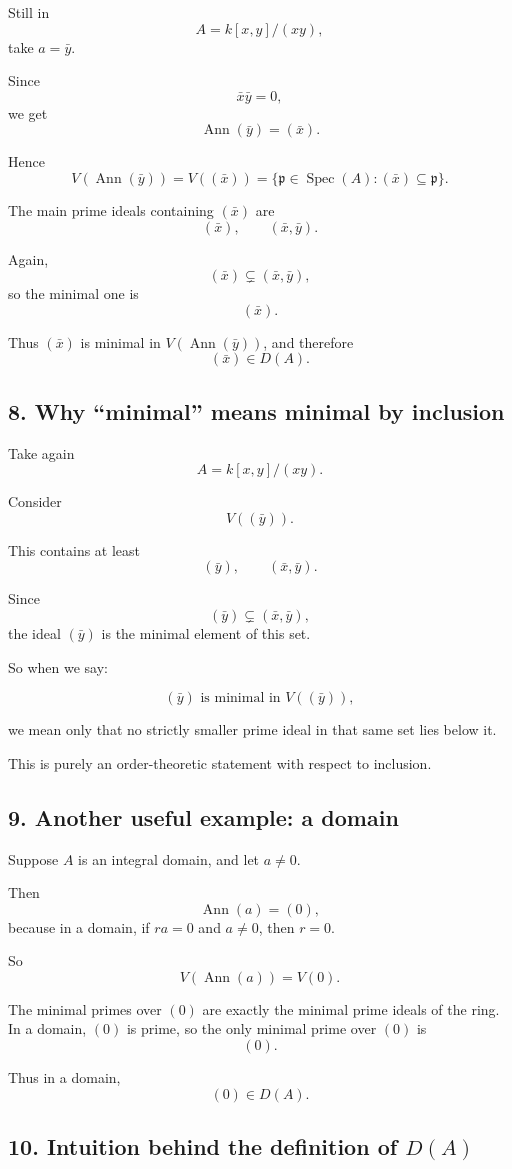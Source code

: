 \documentclass[12pt,a4paper]{article}
\theoremstyle{notespace}
\DeclareMathOperator{\Spec}{Spec}
\DeclareMathOperator{\Ann}{Ann}
\begin{document}
Still in
\[
A=k[x,y]/(xy),
\]
take \(a=\bar y\).

Since
\[
\bar x\bar y=0,
\]
we get
\[
\Ann(\bar y)=(\bar x).
\]

Hence
\[
V(\Ann(\bar y))=V((\bar x))
=\{\mathfrak p\in \Spec(A): (\bar x)\subseteq \mathfrak p\}.
\]

The main prime ideals containing \((\bar x)\) are
\[
(\bar x), \qquad (\bar x,\bar y).
\]

Again,
\[
(\bar x)\subsetneq (\bar x,\bar y),
\]
so the minimal one is
\[
(\bar x).
\]

Thus \((\bar x)\) is minimal in \(V(\Ann(\bar y))\), and therefore
\[
(\bar x)\in D(A).
\]

\subsection*{8. Why ``minimal'' means minimal by inclusion}

Take again
\[
A=k[x,y]/(xy).
\]

Consider
\[
V((\bar y)).
\]

This contains at least
\[
(\bar y), \qquad (\bar x,\bar y).
\]

Since
\[
(\bar y)\subsetneq (\bar x,\bar y),
\]
the ideal \((\bar y)\) is the minimal element of this set.

So when we say:

\[
(\bar y)\text{ is minimal in }V((\bar y)),
\]

we mean only that no strictly smaller prime ideal in that same set lies below it.

This is purely an order-theoretic statement with respect to inclusion.

\subsection*{9. Another useful example: a domain}

Suppose \(A\) is an integral domain, and let \(a\neq 0\).

Then
\[
\Ann(a)=(0),
\]
because in a domain, if \(ra=0\) and \(a\neq 0\), then \(r=0\).

So
\[
V(\Ann(a))=V(0).
\]

The minimal primes over \((0)\) are exactly the minimal prime ideals of the ring. In a domain, \((0)\) is prime, so the only minimal prime over \((0)\) is
\[
(0).
\]

Thus in a domain,
\[
(0)\in D(A).
\]

\subsection*{10. Intuition behind the definition of \(D(A)\)}
\end{document}
